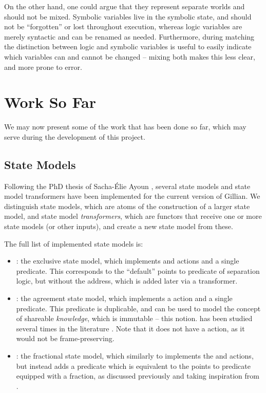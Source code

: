 On the other hand, one could argue that they represent separate worlds and should not be mixed. Symbolic variables live in the symbolic state, and should not be ``forgotten'' or lost throughout execution, whereas logic variables are merely syntactic and can be renamed as needed. Furthermore, during matching the distinction between logic and symbolic variables is useful to easily indicate which variables can and cannot be changed -- mixing both makes this less clear, and more prone to error.

\section{Work So Far}

We may now present some of the work that has been done so far, which may serve during the development of this project.

\subsection{State Models}
\label{sec:state-models-work}

Following the PhD thesis of Sacha-Élie Ayoun \cite{sacha-phd}, several state models and state model transformers have been implemented for the current version of Gillian. We distinguish state models, which are atoms of the construction of a larger state model, and state model \emph{transformers}, which are functors that receive one or more state models (or other inputs), and create a new state model from these.

The full list of implemented state models is: \begin{itemize}
	\item {}: the exclusive state model, which implements  and  actions and a single  predicate. This corresponds to the ``default'' points to predicate of separation logic, but without the address, which is added later via a transformer.
	\item {}: the agreement state model, which implements a  action and a single  predicate. This predicate is duplicable, and can be used to model the concept of shareable \emph{knowledge}, which is immutable -- this notion. has been studied several times in the literature \cite{higherorderseplogic, statesoundness, monotonicstate, iris}. Note that it does not have a  action, as it would not be frame-preserving.
	\item {}: the fractional state model, which similarly to  implements the  and  actions, but instead adds a  predicate which is equivalent to the points to predicate equipped with a fraction, as discussed previously and taking inspiration from \cite{fracpermissions, fracpermissions2}.
\end{itemize}

